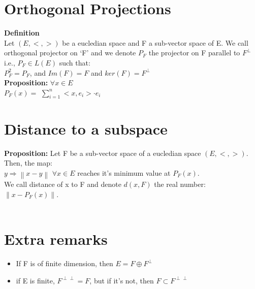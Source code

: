 \documentclass{article}
\begin{document}
\section{Orthogonal Projections}
\textbf{Definition}\\
Let $ (E, <,>) $ be a eucledian space and F a sub-vector space of E. We call orthogonal projector on `F' and we denote $ P_{F} $ the projector on F parallel to $ F^{\perp} $ i.e.,
$ P_{F} \in L(E) $ such that:\\
$ P_{F} ^ 2 = P_{F} $, and $ Im(F) = F $ and $ ker(F) = F^{\perp} $\\
\textbf{Proposition:} $ \forall x \in E $\\

$ P_{F} (x) = $ $ \displaystyle\sum_{i=1}^{n}  <x,e_{i}>\cdot e_{i} $\\
\section{Distance to a subspace}
\textbf{Proposition:} Let F be a sub-vector space of a eucledian space $ (E, <,>) $. Then, the map:\\
$ y \Rightarrow \left\lVert x - y \right\rVert $ $ \forall x \in E $ reaches it's minimum value at $ P_{F} (x) $.\\
We call distance of x to F and denote $ d(x, F) $ the real number: $ \left\lVert x - P_{F} (x) \right\rVert $.\\
\\
\section{Extra remarks}
\begin{itemize}
    \item If F is of finite dimension, then $ E = F \oplus F^{\perp} $
    \item if E is finite, $ F^{\perp \perp } = F $, but if it's not, then $ F \subset F^{\perp \perp} $
\end{itemize}
\end{document}
